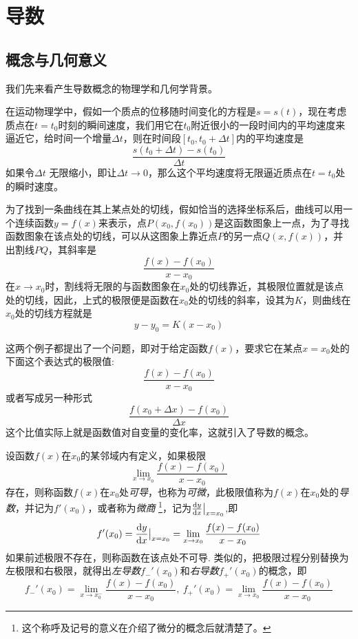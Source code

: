
\section{导数}
\label{sec:derivative}

\subsection{概念与几何意义}
\label{sec:concept-of-derivative}

我们先来看产生导数概念的物理学和几何学背景。

在运动物理学中，假如一个质点的位移随时间变化的方程是$s=s(t)$，现在考虑质点在$t=t_0$时刻的瞬间速度，我们用它在$t_0$附近很小的一段时间内的平均速度来逼近它，给时间一个增量$\Delta t$，则在时间段$[t_0,t_0+\Delta t]$内的平均速度是
\[ \frac{s(t_0+\Delta t)-s(t_0)}{\Delta t} \]
如果令$\Delta t$ 无限缩小，即让$\Delta t \to 0$，那么这个平均速度将无限逼近质点在$t=t_0$处的瞬时速度。

为了找到一条曲线在其上某点处的切线，假如恰当的选择坐标系后，曲线可以用一个连续函数$y=f(x)$来表示，点$P(x_0,f(x_0))$是这函数图象上一点，为了寻找函数图象在该点处的切线，可以从这图象上靠近点$P$的另一点$Q(x,f(x))$，并出割线$PQ$，其斜率是
\[ \frac{f(x)-f(x_0)}{x-x_0} \]
在$x \to x_0$时，割线将无限的与函数图象在$x_0$处的切线靠近，其极限位置就是该点处的切线，因此，上式的极限便是函数在$x_0$处的切线的斜率，设其为$K$，则曲线在$x_0$处的切线方程就是
\[ y-y_0 = K(x-x_0) \]

这两个例子都提出了一个问题，即对于给定函数$f(x)$，要求它在某点$x=x_0$处的下面这个表达式的极限值:
\[ \frac{f(x)-f(x_0)}{x-x_0} \]
或者写成另一种形式
\[ \frac{f(x_0+\Delta x)-f(x_0)}{\Delta x} \]
这个比值实际上就是函数值对自变量的变化率，这就引入了导数的概念。

\begin{definition}
  设函数$f(x)$在$x_0$的某邻域内有定义，如果极限
  \[ \lim_{x \to x_0} \frac{f(x)-f(x_0)}{x-x_0} \]
  存在，则称函数$f(x)$在$x_0$处\emph{可导}，也称为\emph{可微}，此极限值称为$f(x)$在$x_0$处的\emph{导数}，并记为$f'(x_0)$，或者称为\emph{微商} \footnote{这个称呼及记号的意义在介绍了微分的概念后就清楚了。}，记为$\frac{\mathop{}\!\mathrm{d} y}{\mathop{}\!\mathrm{d} x} \big| _{x=x_0} $,即
  \[ f'(x_0) = \frac{\mathop{}\!\mathrm{d} y}{\mathop{}\!\mathrm{d} x} \big| _{x=x_0} = \lim_{x \to x_0} \frac{f(x)-f(x_0)}{x-x_0} \]
  如果前述极限不存在，则称函数在该点处不可导. 类似的，把极限过程分别替换为左极限和右极限，就得出\emph{左导数}$f_-'(x_0)$和\emph{右导数}$f_+'(x_0)$的概念，即
  \[ f_-'(x_0) = \lim_{x \to x_0^-} \frac{f(x)-f(x_0)}{x-x_0}, \ f_+'(x_0) = \lim_{x \to x_0} \frac{f(x)-f(x_0)}{x-x_0} \]
\end{definition}

